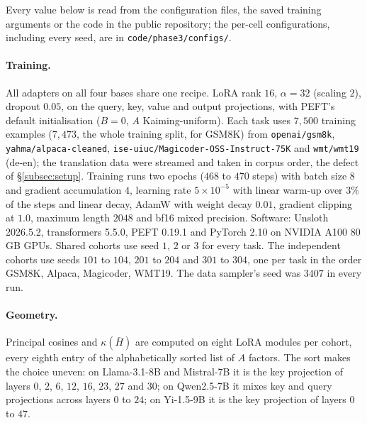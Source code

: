 Every value below is read from the configuration files, the saved training
arguments or the code in the public repository; the per-cell configurations,
including every seed, are in \texttt{code/phase3/configs/}.

\paragraph{Training.} All adapters on all four bases share one recipe. LoRA
rank $16$, $\alpha = 32$ (scaling $2$), dropout $0.05$, on the query, key,
value and output projections, with PEFT's default initialisation ($B = 0$, $A$
Kaiming-uniform). Each task uses $7{,}500$ training examples ($7{,}473$, the
whole training split, for GSM8K) from \texttt{openai/gsm8k},
\texttt{yahma/alpaca-cleaned}, \texttt{ise-uiuc/Magicoder-OSS-Instruct-75K} and
\texttt{wmt/wmt19} (de-en); the translation data were streamed and taken in
corpus order, the defect of \S\ref{subsec:setup}. Training runs two epochs
($468$ to $470$ steps) with batch size $8$ and gradient accumulation $4$,
learning rate $5\times10^{-5}$ with linear warm-up over $3\%$ of the steps and
linear decay, AdamW with weight decay $0.01$, gradient clipping at $1.0$,
maximum length $2048$ and bf16 mixed precision. Software: Unsloth 2026.5.2,
transformers 5.5.0, PEFT 0.19.1 and PyTorch 2.10 on NVIDIA A100 80\,GB GPUs.
Shared cohorts use seed $1$, $2$ or $3$ for every task. The independent
cohorts use seeds $101$ to $104$, $201$ to $204$ and $301$ to $304$, one per
task in the order GSM8K, Alpaca, Magicoder, WMT19. The data sampler's seed was
$3407$ in every run.

\paragraph{Geometry.} Principal cosines and $\kappa(\bar H)$ are computed on
eight LoRA modules per cohort, every eighth entry of the alphabetically sorted
list of $A$ factors. The sort makes the choice uneven: on Llama-3.1-8B and
Mistral-7B it is the key projection of layers $0$, $2$, $6$, $12$, $16$, $23$,
$27$ and $30$; on Qwen2.5-7B it mixes key and query projections across layers
$0$ to $24$; on Yi-1.5-9B it is the key projection of layers $0$ to $47$.

